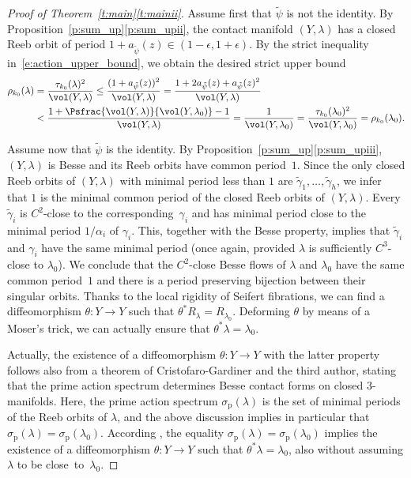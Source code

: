 \begin{proof}[Proof of Theorem~\ref{t:main}\eqref{t:mainii}]
Assume first that $\tilde\psi$ is not the identity. By Proposition~\ref{p:sum_up}\eqref{p:sum_upii}, the contact manifold $(Y,\lambda)$ has a closed Reeb orbit of period $1+a_{\tilde\psi}(z)\in(1-\epsilon,1+\epsilon)$. By the strict inequality in~\eqref{e:action_upper_bound}, we obtain the desired strict upper bound
\begin{align*}
\rho_{k_0}(\lambda)
&=
\frac{\tau_{k_0}(\lambda)^2}{\vol(Y,\lambda)}
\leq
\frac{(1+a_{\tilde\psi}(z))^2}{\vol(Y,\lambda)}
=
\frac{1+2a_{\tilde\psi}(z)+a_{\tilde\psi}(z)^2}{\vol(Y,\lambda)}\\
&<
\frac{1+\Psfrac{\vol(Y,\lambda)}{\vol(Y,\lambda_0)}-1}{\vol(Y,\lambda)}
= \frac{1}{\vol(Y,\lambda_0)} = \frac{\tau_{k_0}(\lambda_0)^2}{\vol(Y,\lambda_0)} = \rho_{k_0}(\lambda_0).
\end{align*}

Assume now that $\tilde\psi$ is the identity. By Proposition~\ref{p:sum_up}\eqref{p:sum_upiii}, $(Y,\lambda)$ is Besse and its Reeb orbits have common period~$1$. Since the only closed Reeb orbits of $(Y,\lambda)$ with minimal period less than $1$ are $\tilde\gamma_1,\dots,\tilde\gamma_h$, we infer that $1$ is the minimal common period of the closed Reeb orbits of $(Y,\lambda)$. Every $\tilde\gamma_i$ is $C^2$-close to the corresponding~$\gamma_i$ and has minimal period close to the minimal period $1/\alpha_i$ of $\gamma_i$. This, together with the Besse property, implies that $\tilde\gamma_i$ and $\gamma_i$ have the same minimal period (once again, provided $\lambda$ is sufficiently $C^3$-close to $\lambda_0$). We conclude that the $C^2$-close Besse flows of $\lambda$ and $\lambda_0$ have the same common period~$1$ and there is a period preserving bijection between their singular orbits. Thanks to the local rigidity of Seifert fibrations, we can find a diffeomorphism $\theta:Y\to Y$ such that $\theta^*R_{\lambda}= R_{\lambda_0}$. Deforming $\theta$ by means of a Moser's trick, we can actually ensure that $\theta^* \lambda=\lambda_0$.

Actually, the existence of a diffeomorphism $\theta:Y\to Y$ with the latter property follows also from a theorem of Cristofaro-Gardiner and the third author, stating that the prime action spectrum determines Besse contact forms on closed $3$-manifolds. Here, the prime action spectrum $\sigma_{\mathrm{p}}(\lambda)$ is the set of minimal periods of the Reeb orbits of $\lambda$, and the above discussion implies in particular that $\sigma_{\mathrm{p}}(\lambda) = \sigma_{\mathrm{p}}(\lambda_0)$. According \cite[Th.\,1.5]{Cristofaro-Gardiner:2020aa}, the equality $\sigma_{\mathrm{p}}(\lambda) = \sigma_{\mathrm{p}}(\lambda_0)$ implies the existence of a diffeomorphism $\theta:Y\to Y$ such that $\theta^*\lambda=\lambda_0$, also without assuming $\lambda$ to be close~to~$\lambda_0$.


\end{proof}
